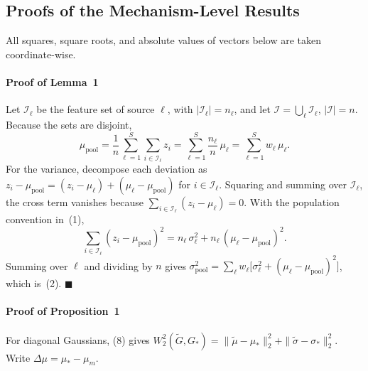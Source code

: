 
\subsection{Proofs of the Mechanism-Level Results}
\label{app:mech_proofs}

All squares, square roots, and absolute values of vectors below are taken
coordinate-wise.

\paragraph*{Proof of Lemma~1}
Let $\mathcal{I}_\ell$ be the feature set of source $\ell$, with
$|\mathcal{I}_\ell| = n_\ell$, and let $\mathcal{I} = \bigcup_\ell \mathcal{I}_\ell$,
$|\mathcal{I}| = n$. Because the sets are disjoint,
\begin{equation*}
\mu_{\mathrm{pool}} = \frac{1}{n}\sum_{\ell=1}^{S}\sum_{i\in\mathcal{I}_\ell} z_i
= \sum_{\ell=1}^{S}\frac{n_\ell}{n}\,\mu_\ell = \sum_{\ell=1}^{S} w_\ell\,\mu_\ell .
\end{equation*}
For the variance, decompose each deviation as
$z_i - \mu_{\mathrm{pool}} = (z_i - \mu_\ell) + (\mu_\ell - \mu_{\mathrm{pool}})$ for
$i \in \mathcal{I}_\ell$. Squaring and summing over $\mathcal{I}_\ell$, the
cross term vanishes because $\sum_{i\in\mathcal{I}_\ell}(z_i - \mu_\ell) = 0$.
With the population convention in~(1),
\begin{equation*}
\sum_{i\in\mathcal{I}_\ell}(z_i - \mu_{\mathrm{pool}})^2
= n_\ell\,\sigma_\ell^2 + n_\ell\,(\mu_\ell - \mu_{\mathrm{pool}})^2 .
\end{equation*}
Summing over $\ell$ and dividing by $n$ gives
$\sigma_{\mathrm{pool}}^2 = \sum_\ell w_\ell\bigl[\sigma_\ell^2 + (\mu_\ell - \mu_{\mathrm{pool}})^2\bigr]$,
which is~(2). \hfill$\blacksquare$

\paragraph*{Proof of Proposition~1}
For diagonal Gaussians, (8) gives
$W_2^2(\widetilde{G}, G_*) = \|\tilde\mu - \mu_*\|_2^2 + \|\tilde\sigma - \sigma_*\|_2^2$.
Write $\Delta\mu = \mu_* - \mu_m$.

